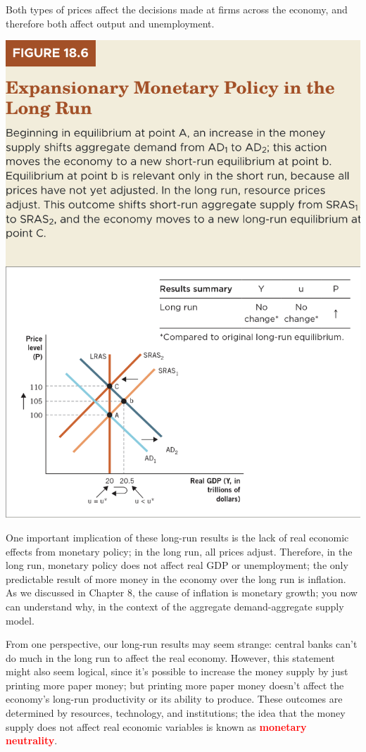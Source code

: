 \documentclass[11pt]{article} %
\begin{document}
Both types of prices affect the decisions made at firms across the economy, and therefore both affect output and unemployment.


\begin{center}
\includegraphics[scale=0.5]{images/Figure 18.6.png} 
\end{center}
One important implication of these long-run results is the lack of real economic effects from monetary policy; in the long run, all prices adjust. Therefore, in the long run, monetary policy does not affect real GDP or unemployment; the only predictable result of more money in the economy over the long run is inflation. As we discussed in Chapter 8, the cause of inflation is monetary growth; you now can understand why, in the context of the aggregate demand-aggregate supply model.

From one perspective, our long-run results may seem strange: central banks can't do much in the long run to affect the real economy. However, this statement might also seem logical, since it's possible to increase the money supply by just printing more paper money; but printing more paper money doesn't affect the economy's long-run productivity or its ability to produce. These outcomes are determined by resources, technology, and institutions; the idea that the money supply does not affect real economic variables is known as \textbf{\textcolor{red}{monetary neutrality}}.
\end{document}
